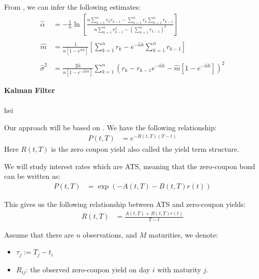 \newpage
From \cite{Chalmers_MSc}, we can infer the following estimates: 
\begin{align*}
\hat{\alpha} &= 
-\frac{1}{n}\ln\left[
\frac{
n\sum_{k=1}^{n}r_{k}r_{k-1} - \sum_{k=1}^{n}r_{k}\sum_{k=1}^{n}r_{k-1}
}{
n\sum_{k=1}^{n}r_{k-1}^{2} - \left(\sum_{k=1}^{n}r_{k-1}\right)^{2}
}
\right] \\ 
\\ 
\hat{m} &= 
\frac{1}{n[1-e^{\hat{\alpha}h}]}
\left[
\sum_{k=1}^{n}r_{k} - e^{-\hat{\alpha}h}\sum_{k=1}^{n}r_{k-1}
\right] \\ 
\\ 
\hat{\sigma}^{2} &= 
\frac{
2\hat{\alpha}
}
{
n[1-e^{-2\hat{\alpha}h}]
}
\sum_{k=1}^{n}\left(
r_{k} - r_{k-1}e^{-\hat{\alpha}h} 
- \hat{m}[1-e^{-\hat{\alpha}h}]
\right)^{2}
\end{align*} 

\textbf{Kalman Filter}
\\~\\ 
hei
















\newpage 
Our approach will be based on \cite{halga2014}. We have the following relationship: 
\begin{align*}
P(t,T) &= e^{-R(t,T)(T-t)}
\end{align*}
Here $R(t,T)$ is the zero coupon yield also called the yield term structure. 


We will study interest rates which are ATS, meaning that the zero-coupon bond can be written as:
\begin{align*}
P(t,T) &= 
\exp\left(
-A(t,T) -B(t,T)r(t)
\right)
\end{align*}

This gives us the following relationship between ATS and zero-coupon yields: 
\begin{align*}
R(t,T) &= \frac{
A(t,T) + B(t,T)r(t)
}{
T-t
}    
\end{align*}

Assume that there are $n$ observations, and $M$ maturities, we denote: 
\begin{itemize}
    \item $\tau_{j} := T_{j} - t_{i}$
    \item $R_{ij}$: the observed zero-coupon yield on day $i$ with maturity $j$. 
\end{itemize}

